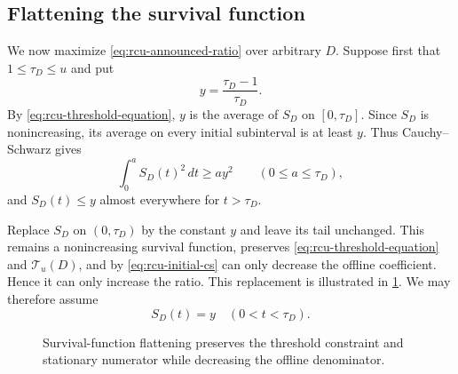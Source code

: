 \subsection{Flattening the survival function}

We now maximize \eqref{eq:rcu-announced-ratio} over arbitrary $D$.  Suppose
first that $1\le\tau_D\le u$ and put
\begin{equation}
 y=\frac{\tau_D-1}{\tau_D}.
 \label{eq:rcu-y}
\end{equation}
By \eqref{eq:rcu-threshold-equation}, $y$ is the average of $S_D$ on
$[0,\tau_D]$.  Since $S_D$ is nonincreasing, its average on every initial
subinterval is at least $y$.  Thus Cauchy--Schwarz gives
\begin{equation}
 \int_0^aS_D(t)^2\,dt\ge ay^2
 \qquad(0\le a\le\tau_D),
 \label{eq:rcu-initial-cs}
\end{equation}
and $S_D(t)\le y$ almost everywhere for $t>\tau_D$.

Replace $S_D$ on $(0,\tau_D)$ by the constant $y$ and leave its tail unchanged.
This remains a nonincreasing survival function, preserves
\eqref{eq:rcu-threshold-equation} and $\mathcal T_u(D)$, and by
\eqref{eq:rcu-initial-cs} can only decrease the offline coefficient.  Hence
it can only increase the ratio.  This replacement is illustrated in
\cref{fig:survival-flattening}.  We may therefore assume
\begin{equation}
 S_D(t)=y\quad(0<t<\tau_D).
 \label{eq:rcu-flat-prefix}
\end{equation}

\begin{figure}[htbp]
\centering
{}
\caption{Survival-function flattening preserves the threshold constraint
and stationary numerator while decreasing the offline denominator.}
\label{fig:survival-flattening}
\end{figure}

